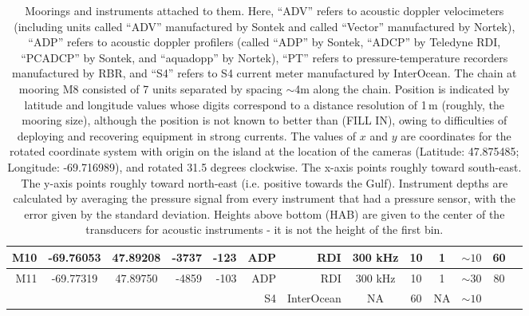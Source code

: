 \documentclass[letterpaper,10pt,landscape]{article}
\begin{document}
\begin{table}
\begin{tabular}{|r|c|c|r|r|r|r|c|c|c|c|c|c|}
    M10                 & -69.76053                  & 47.89208                  & -3737                  & -123                  & ADP          & RDI        & 300 kHz   & 10        & 1        & $\sim10$   & 60                  \\\hline
    \multirow{2}{*}{M11}& \multirow{2}{*}{-69.77319} & \multirow{2}{*}{47.89750} & \multirow{2}{*}{-4859} & \multirow{2}{*}{-103} & ADP          & RDI        & 300 kHz   & 10        & 1        & $\sim30$   & \multirow{2}{*}{80} \\
    ~                   &                            &                           &                        &                       & S4           & InterOcean & NA        & 60        & NA       & $\sim10$   &                     \\\hline
  \end{tabular}
  
  \caption{Moorings and instruments attached to them.  Here, ``ADV''
    refers to acoustic doppler velocimeters (including units called
    ``ADV'' manufactured by Sontek and called ``Vector'' manufactured
    by Nortek), ``ADP'' refers to acoustic doppler profilers
    (called ``ADP'' by Sontek, ``ADCP'' by Teledyne RDI, ``PCADCP'' by
    Sontek, and ``aquadopp'' by Nortek), ``PT'' refers to
    pressure-temperature recorders manufactured by RBR, and ``S4''
    refers to S4 current meter manufactured by InterOcean.  The chain at
    mooring M8 consisted of 7 units separated by spacing $\sim$4m along
    the chain.  Position is indicated by latitude and longitude values
    whose digits correspond to a distance resolution of 1\,m (roughly,
    the mooring size), although the position is not known to better
    than (FILL IN), owing to difficulties of deploying and recovering
    equipment in strong currents.  The values of $x$ and $y$ are
    coordinates for the rotated coordinate system with origin on
    the island at the location of the cameras (Latitude: 47.875485;
    Longitude: -69.716989), and rotated 31.5 degrees clockwise. The
    x-axis points roughly toward south-east. The y-axis points roughly
    toward north-east (i.e. positive towards the Gulf). Instrument
    depths are calculated by averaging the pressure signal from every
    instrument that had a pressure sensor, with the error given by the
    standard deviation. Heights above bottom (HAB) are given to the
    center of the transducers for acoustic instruments - it is not the
    height of the first bin.}
  \end{table}
\end{document}
